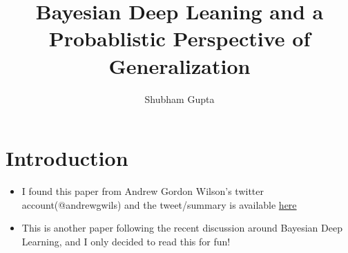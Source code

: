 \documentclass[a4paper]{article}
\title{Bayesian Deep Leaning and a Probablistic Perspective of Generalization}
\author{Shubham Gupta}
\begin{document}
\maketitle
\section{Introduction}
\begin{itemize}
    \item I found this paper from Andrew Gordon Wilson's twitter account(@andrewgwils) and the tweet/summary is available \href{https://twitter.com/andrewgwils/status/1230669857840123906}{here}
    \item This is another paper following the recent discussion around Bayesian Deep Learning, and I only decided to read this for fun!
\end{itemize}
\end{document}
